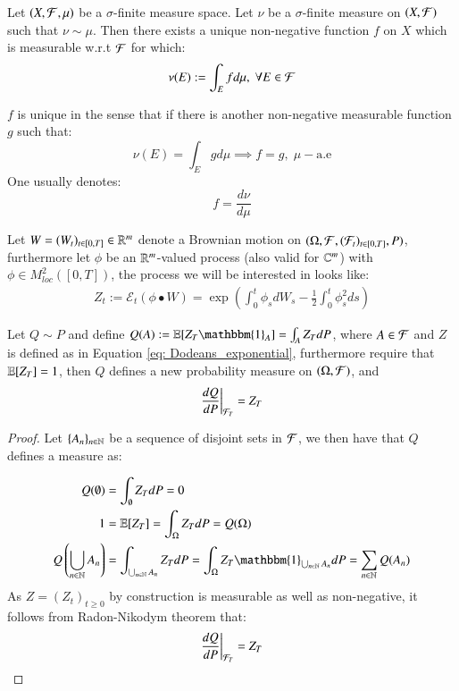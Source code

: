 \begin{theorem}
Let $(X, \mathcal{F}, \mu)$ be a $\sigma$-finite measure space. Let $\nu$ be a $\sigma$-finite measure on $(X, \mathcal{F})$ such that $\nu \sim \mu$. Then there exists a unique non-negative function $f$ on $X$ which is measurable w.r.t $\mathcal{F}$ for which: 
\begin{align*}
\nu(E) := \int_{E}fd\mu, \; \forall  E\in \mathcal{F}    
\end{align*}

$f$ is unique in the sense that if there is another non-negative measurable function $g$ such that:
\[
\nu(E) = \int_{E}gd\mu \implies f=g,\; \mu-\text{a.e}
\]
One usually denotes: 
\[
f = \frac{d\nu}{d\mu}
\]
\end{theorem} 

Let $W = (W_{t})_{t\in [0,T]} \in \mathbb{R}^{m}$ denote a Brownian motion on $(\Omega, \mathcal{F}, (\mathcal{F}_{t})_{t\in [0,T]}, P)$, furthermore let $\phi$ be an $\mathbb{R}^{m}$-valued process (also valid for $\mathbb{C}^{m}$) with \\
$\phi \in M^{2}_{loc}([0,T])$, the process we will be interested in looks like: 
\begin{align}
\label{eq: Dodeans_exponential}
Z_{t} := \mathcal{E}_{t}\left(
\phi \bullet W
\right) =
\exp\left(
\int_{0}^{t}\phi_{s}dW_{s} - \frac{1}{2}\int_{0}^{t}\phi_{s}^{2}ds
\right)
\end{align}

\begin{proposition}
Let $Q\sim P$ and define 
$Q(A) := \E[Z_{T}\mathbbm{1}_{A}] = \int_{A}Z_{T}dP$, where $A \in \mathcal{F}$ and $Z$ is defined as in Equation \ref{eq: Dodeans_exponential}, furthermore require that $\mathbb{E}[Z_{T}] = 1$, then $Q$ defines a new probability measure on $(\Omega, \mathcal{F})$, and $$
\frac{dQ}{dP}\bigg{|}_{\mathcal{F}_{T}} = Z_{T}
$$
\end{proposition}

\begin{proof}
Let $\{A_{n}\}_{n\in \mathbb{N}}$ be a sequence of disjoint sets in $\mathcal{F}$, we then have that $Q$ defines a measure as: 

\begin{align*}
Q(\emptyset) &= \int_{\emptyset}Z_{T}dP = 0 \\
1 &= \E[Z_{T}] = \int_{\Omega}Z_{T}dP = Q(\Omega)\\ 
Q\left(
\bigcup_{n\in \N}A_{n}
\right)
&= 
\int_{\bigcup_{n\in \N}A_{n}}Z_{T}dP
= \int_{\Omega}Z_{T}\mathbbm{1}_{\bigcup_{n\in \N}A_{n}}dP
= \sum_{n\in \N}Q(A_{n})
\end{align*}
As $Z = (Z_{t})_{t\geq 0}$ by construction is measurable as well as non-negative, it follows from Radon-Nikodym theorem that: 
\[
\frac{dQ}{dP}\bigg{|}_{\mathcal{F}_{T}} = Z_{T}
\]
\end{proof}

